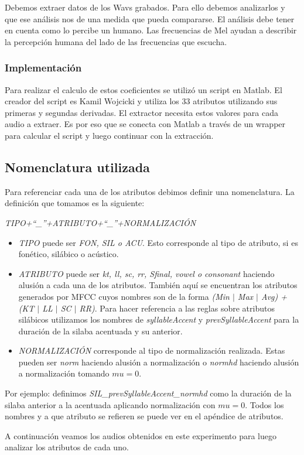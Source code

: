 Debemos extraer datos de los Wavs grabados. Para ello debemos analizarlos y que ese análisis nos de una medida que pueda compararse. El análisis debe tener en cuenta como lo percibe un humano. Las frecuencias de Mel ayudan a describir la percepción humana del lado de las frecuencias que escucha. 

\subsubsection{Implementación}

Para realizar el calculo de estos coeficientes se utilizó un script en Matlab. El creador del script es Kamil Wojcicki y utiliza los 33 atributos utilizando sus primeras y segundas derivadas. El extractor necesita estos valores para cada audio a extraer. Es por eso que se conecta con Matlab a través de un wrapper para calcular el script y luego continuar con la extracción.

\subsection{Nomenclatura utilizada}
Para referenciar cada una de los atributos debimos definir una nomenclatura. La definición que tomamos es la siguiente:
\begin{center}
\textit{TIPO+``\_''+ATRIBUTO+``\_''+NORMALIZACIÓN} 
\end{center}

\begin{itemize}
  \item \emph{TIPO} puede ser \emph{FON, SIL o ACU}. Esto corresponde al tipo de atributo, si es fonético, silábico o acústico.
  \item \emph{ATRIBUTO} puede ser \emph{kt, ll, sc, rr, Sfinal, vowel o consonant} haciendo alusión a cada una de los atributos. También aquí se encuentran los atributos generados por MFCC cuyos nombres son de la forma \emph{(Min $|$ Max $|$ Avg) + (KT $|$ LL $|$ SC $|$ RR)}. Para hacer referencia a las reglas sobre atributos silábicos utilizamos los nombres de \emph{syllableAccent} y \emph{prevSyllableAccent} para la duración de la silaba acentuada y su anterior.
  \item \emph{NORMALIZACIÓN} corresponde al tipo de normalización realizada. Estas pueden ser \emph{norm} haciendo alusión a normalización o \emph{normhd} haciendo alusión a normalización tomando $mu=0$.
\end{itemize}
 
Por ejemplo: definimos \textit{SIL\_prevSyllableAccent\_normhd} como la duración de la silaba anterior a la acentuada aplicando normalización con $mu=0$. Todos los nombres y a que atributo se refieren se puede ver en el apéndice de atributos.

A continuación veamos los audios obtenidos en este experimento para luego analizar los atributos de cada uno.